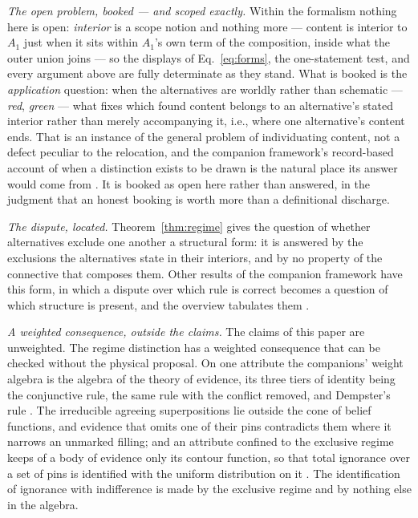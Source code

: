 \documentclass[11pt]{article}
\begin{document}
\emph{The open problem, booked --- and scoped exactly.} Within the formalism nothing here is open: \emph{interior} is a scope notion and nothing more --- content is interior to $A_1$ just when it sits within $A_1$'s own term of the composition, inside what the outer union joins --- so the displays of Eq.~\eqref{eq:forms}, the one-statement test, and every argument above are fully determinate as they stand. What is booked is the \emph{application} question: when the alternatives are worldly rather than schematic --- \emph{red}, \emph{green} --- what fixes which found content belongs to an alternative's stated interior rather than merely accompanying it, i.e., where one alternative's content ends. That is an instance of the general problem of individuating content, not a defect peculiar to the relocation, and the companion framework's record-based account of when a distinction exists to be drawn is the natural place its answer would come from \parencite{Aethus}. It is booked as open here rather than answered, in the judgment that an honest booking is worth more than a definitional discharge.

\emph{The dispute, located.} Theorem~\ref{thm:regime} gives the question of whether alternatives exclude one another a structural form: it is answered by the exclusions the alternatives state in their interiors, and by no property of the connective that composes them. Other results of the companion framework have this form, in which a dispute over which rule is correct becomes a question of which structure is present, and the overview tabulates them \parencite{AethusBrief}.

\emph{A weighted consequence, outside the claims.} The claims of this paper are unweighted. The regime distinction has a weighted consequence that can be checked without the physical proposal. On one attribute the companions' weight algebra is the algebra of the theory of evidence, its three tiers of identity being the conjunctive rule, the same rule with the conflict removed, and Dempster's rule \parencite{AethusEvidence}. The irreducible agreeing superpositions lie outside the cone of belief functions, and evidence that omits one of their pins contradicts them where it narrows an unmarked filling; and an attribute confined to the exclusive regime keeps of a body of evidence only its contour function, so that total ignorance over a set of pins is identified with the uniform distribution on it \parencite{shafer1976, AethusEvidence}. The identification of ignorance with indifference is made by the exclusive regime and by nothing else in the algebra.
\end{document}
